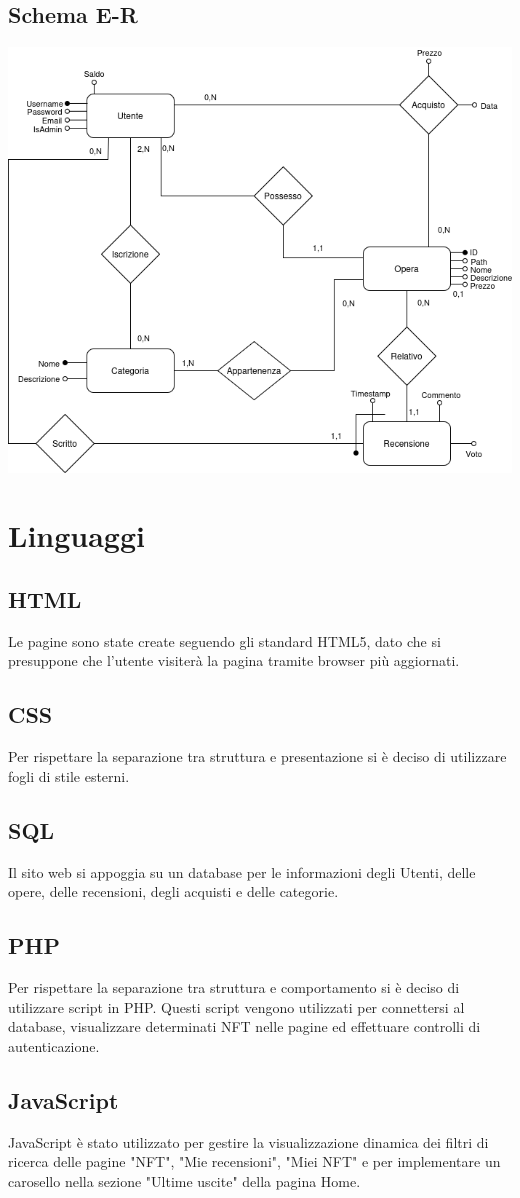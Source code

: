 \documentclass[10pt]{article}
\begin{document}
\subsection{Schema E-R}
\begin{center}
    \includegraphics[width=0.6\linewidth]{schema_ristrutturato.png}
\end{center}

\section{Linguaggi}
\subsection{HTML}
Le pagine sono state create seguendo gli standard HTML5, dato che si presuppone che l'utente visiterà la pagina tramite browser più aggiornati.
\subsection{CSS}
Per rispettare la separazione tra struttura e presentazione si è deciso di utilizzare fogli di stile esterni.
\subsection{SQL}
Il sito web si appoggia su un database per le informazioni degli Utenti, delle opere, delle recensioni, degli acquisti e delle categorie.
\subsection{PHP} 
Per rispettare la separazione tra struttura e comportamento si è deciso di utilizzare script in PHP. Questi script vengono utilizzati per connettersi al database, visualizzare determinati NFT nelle pagine ed effettuare controlli di autenticazione.
\subsection{JavaScript}
JavaScript è stato utilizzato per gestire la visualizzazione dinamica dei filtri di ricerca delle pagine "NFT", "Mie recensioni", "Miei NFT" e per implementare un carosello nella sezione "Ultime uscite" della pagina Home.
\end{document}
